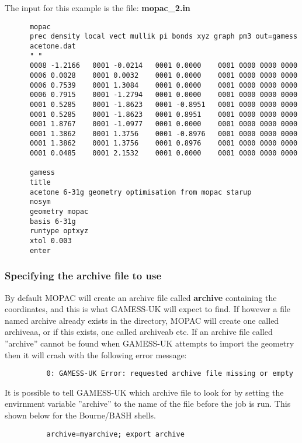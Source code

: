 \documentclass[11pt]{book}
\begin{document}
The input for this example is the file: {\footnotesize \textbf{mopac\_2.in}}
{
\footnotesize
\begin{verbatim}
	  mopac
	  prec density local vect mullik pi bonds xyz graph pm3 out=gamess
	  acetone.dat
	  " "
	  0008 -1.2166   0001 -0.0214   0001 0.0000    0001 0000 0000 0000
	  0006 0.0028    0001 0.0032    0001 0.0000    0001 0000 0000 0000
	  0006 0.7539    0001 1.3084    0001 0.0000    0001 0000 0000 0000
	  0006 0.7915    0001 -1.2794   0001 0.0000    0001 0000 0000 0000
	  0001 0.5285    0001 -1.8623   0001 -0.8951   0001 0000 0000 0000
	  0001 0.5285    0001 -1.8623   0001 0.8951    0001 0000 0000 0000
	  0001 1.8767    0001 -1.0977   0001 0.0000    0001 0000 0000 0000
	  0001 1.3862    0001 1.3756    0001 -0.8976   0001 0000 0000 0000
	  0001 1.3862    0001 1.3756    0001 0.8976    0001 0000 0000 0000
	  0001 0.0485    0001 2.1532    0001 0.0000    0001 0000 0000 0000

	  gamess
	  title
	  acetone 6-31g geometry optimisation from mopac starup
	  nosym
	  geometry mopac
	  basis 6-31g
	  runtype optxyz
	  xtol 0.003
	  enter
\end{verbatim}
}


\subsubsection{Specifying the archive file to use}
By default MOPAC will create an archive file called
{\footnotesize\textbf{archive}} containing the coordinates, and this
is what GAMESS-UK will expect to find. If however a file named archive
already exists in the directory, MOPAC will create one called
archiveaa, or if this exists, one called archiveab etc. If an archive
file called ''archive'' cannot be found when GAMESS-UK attempts to
import the geometry then it will crash with the following error
message:

{
\footnotesize
\begin{verbatim}
          0: GAMESS-UK Error: requested archive file missing or empty
\end{verbatim}
}


It is possible to tell GAMESS-UK which archive file to look for by
setting the envirnment variable ''archive'' to the name of the file
before the job is run. This shown below for the Bourne/BASH shells.

{
\footnotesize
\begin{verbatim}
          archive=myarchive; export archive
\end{verbatim}
}
\end{document}
